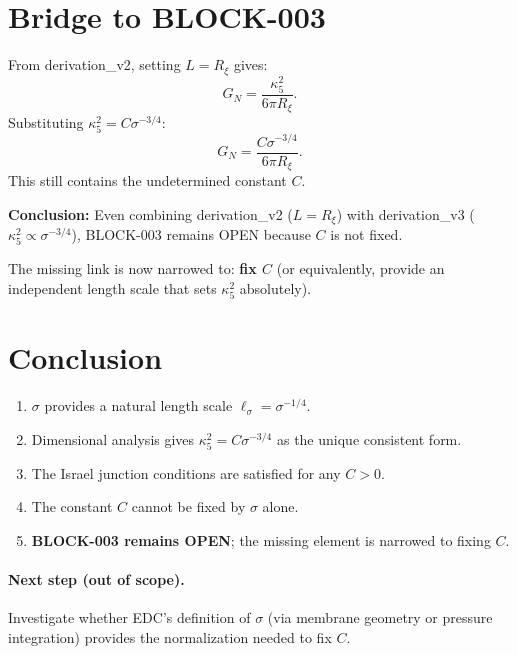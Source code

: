 \documentclass[11pt,a4paper]{article}
\begin{document}
\section{Bridge to BLOCK-003}
\label{sec:bridge}

From derivation\_v2, setting $L = R_\xi$ gives:
\begin{equation}
    G_N = \frac{\kappa_5^2}{6\pi R_\xi}.
\end{equation}
Substituting $\kappa_5^2 = C \sigma^{-3/4}$:
\begin{equation}
    G_N = \frac{C \sigma^{-3/4}}{6\pi R_\xi}.
    \label{eq:GN_with_C}
\end{equation}
This still contains the undetermined constant $C$.

\textbf{Conclusion:} Even combining derivation\_v2 ($L = R_\xi$) with derivation\_v3 ($\kappa_5^2 \propto \sigma^{-3/4}$), BLOCK-003 remains OPEN because $C$ is not fixed.

The missing link is now narrowed to: \textbf{fix $C$} (or equivalently, provide an independent length scale that sets $\kappa_5^2$ absolutely).

\section{Conclusion}
\label{sec:conclusion}

\begin{enumerate}[nosep]
    \item $\sigma$ provides a natural length scale $\ell_\sigma = \sigma^{-1/4}$.
    \item Dimensional analysis gives $\kappa_5^2 = C \sigma^{-3/4}$ as the unique consistent form.
    \item The Israel junction conditions are satisfied for any $C > 0$.
    \item The constant $C$ cannot be fixed by $\sigma$ alone.
    \item \textbf{BLOCK-003 remains OPEN}; the missing element is narrowed to fixing $C$.
\end{enumerate}

\paragraph{Next step (out of scope).}
Investigate whether EDC's definition of $\sigma$ (via membrane geometry or pressure integration) provides the normalization needed to fix $C$.
\end{document}
